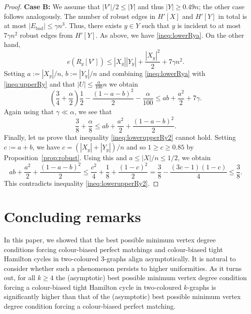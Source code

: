 \documentclass[A4paper,12pt]{article}
\theoremstyle{definition}
\begin{document}
\begin{proof}[Proof]
    \noindent \textbf{Case B:} 
    We assume that $|V'|/2\leq |Y|$ and thus $|Y|\geq 0.49n$; the other case follows analogously. The number of robust edges in $H'[X]$ and $H'[Y]$ in total is at most $|E_{\textrm{bad}}| \le \gamma n^3$. Thus, there exists $y\in Y$ such that $y$ is incident to at most $7\gamma n^2$ robust edges from $H'[Y]$. As above, we have \eqref{ineq:lowerRya}.
    On the other hand,
        \begin{equation}
        \label{ineq:upperRy}
    e(R_y[V'])\leq |X_y||Y_y|+\frac{|X_y|^2}{2}+7\gamma n^2.
    \end{equation}
    Setting $a:=|X_y|/n$, $b:=|Y_y|/n$ and combining \eqref{ineq:lowerRya} with \eqref{ineq:upperRy} and that $|U| \leq \frac{\alpha}{100}n$ we obtain
    \begin{equation*}
    \left(\frac{3}{4}+\frac{\alpha}{2} \right)\frac{1}{2}-\frac{(1 -a-b)^2}{2}-\frac{\alpha}{100} \leq ab+\frac{a^2}{2}+7\gamma .
    \end{equation*}
    Again using that $\gamma \ll \alpha$, we see that 
    \begin{equation}
    \label{ineq:lowerupperRy2}
  \frac{3}{8}+\frac{\alpha}{8}\leq ab+\frac{a^2}{2}+\frac{(1 -a-b)^2}{2}.
    \end{equation}
    Finally, let us prove that inequality \eqref{ineq:lowerupperRy2} cannot hold. Setting $c:=a+b$, we have $c = (|X_y|+|Y_y|)/n$ and so $1 \ge c \geq 0.85$ by Proposition~\ref{prop:robust}. Using this and $a\leq |X|/n\leq 1/2$, we obtain
        \begin{equation*}
    ab+\frac{a^2}{2}+\frac{(1 -a-b)^2}{2}\leq \frac{c^2}{4}+\frac{1}{8}+\frac{(1-c)^2}{2} = \frac{3}{8} - \frac{(3c-1)(1-c)}{4}\leq \frac{3}{8}.
    \end{equation*}
    This contradicts inequality \eqref{ineq:lowerupperRy2}.\end{proof}

\section{Concluding remarks}\label{sec:concl}

In this paper, we showed that the best possible minimum vertex degree conditions forcing colour-biased perfect matchings and colour-biased tight Hamilton cycles in two-coloured 3-graphs align asymptotically. It is natural to consider whether such a phenomenon persists to higher uniformities. As it turns out, for all $k\geq 4$ the (asymptotic) best possible minimum vertex degree condition forcing a colour-biased tight Hamilton cycle in two-coloured $k$-graphs is significantly higher than that of the (asymptotic) best possible minimum vertex degree condition forcing a colour-biased perfect matching.
\end{document}
